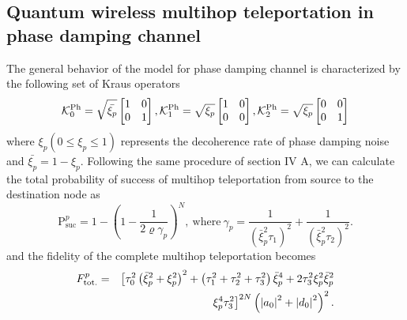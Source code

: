 \documentclass[aps,pra,twocolumn,showpacs,superscriptaddress,groupedaddress]{revtex4}
\begin{document}
\subsection{Quantum wireless multihop teleportation in phase damping channel}
The general behavior of the model for phase damping channel is characterized by the following set of Kraus operators \cite{MA10}
\begin{equation}
\mathcal{K}_0^{\rm Ph}=\sqrt{\bar{\xi_{p}}}\left[\begin{matrix}1&0\\0&1\end{matrix}\right], \mathcal{K}_1^{\rm Ph}=\sqrt{\xi_{p}}\left[\begin{matrix}1&0\\0&0\end{matrix}\right], \mathcal{K}_2^{\rm Ph}=\sqrt{\xi_{p}}\left[\begin{matrix}0&0\\0&1\end{matrix}\right]
\label{}
\end{equation}
where $\xi_p(0\leq\xi_p\leq1)$ represents the decoherence rate of phase damping noise and $\bar{\xi_{p}}=1-\xi_{p}$. Following the same procedure of section IV A, we can calculate the total probability of success of multihop teleportation from source to the destination node as
\begin{equation}
\text{P}_{\text{suc}}^{p}=1-\left(1-\frac{1}{2\varrho\gamma_p}\right)^{N}, \ \mbox{where}\ \gamma_p=\frac{1}{\left(\bar{\xi}_p^2\tau_1\right)^2}+\frac{1}{\left(\bar{\xi}_p^2\tau_2\right)^2}.\label{}
\end{equation}
and the fidelity of the complete multihop teleportation becomes
\begin{eqnarray}
F_{\rm tot.}^p&=&\big[\tau_0^2\left(\bar{\xi}_p^2+\xi_p^2\right)^2+\left(\tau_1^2+\tau_2^2+\tau_3^2\right)\bar{\xi}_p^4+2\tau_3^2\xi^2_p\bar{\xi}_p^2\nonumber\\
&&{\xi}_p^4\tau_3^2\big]^{2N}\left(\left|a_0\right|^2+\left|d_0\right|^2\right)^2.
\end{eqnarray} 
\end{document}
